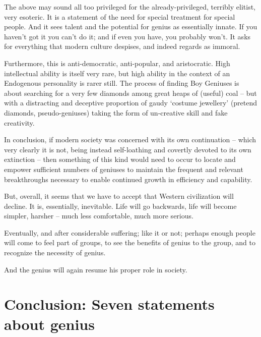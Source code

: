 \documentclass[
]{book}
\begin{document}
The above may sound all too privileged for the already-privileged, terribly elitist, very esoteric. It is a statement of the need for special treatment for special people. And it sees talent and the potential for genius as essentially innate. If you haven't got it you can't do it; and if even you have, you probably won't. It asks for everything that modern culture despises, and indeed regards as immoral.

Furthermore, this is anti-democratic, anti-popular, and aristocratic. High intellectual ability is itself very rare, but high ability in the context of an Endogenous personality is rarer still. The process of finding Boy Geniuses is about searching for a very few diamonds among great heaps of (useful) coal -- but with a distracting and deceptive proportion of gaudy `costume jewellery' (pretend diamonds, pseudo-geniuses) taking the form of un-creative skill and fake creativity.

In conclusion, if modern society was concerned with its own continuation -- which very clearly it is not, being instead self-loathing and covertly devoted to its own extinction -- then something of this kind would need to occur to locate and empower sufficient numbers of geniuses to maintain the frequent and relevant breakthroughs necessary to enable continued growth in efficiency and capability.

But, overall, it seems that we have to accept that Western civilization will decline. It is, essentially, inevitable. Life will go backwards, life will become simpler, harsher -- much less comfortable, much more serious.

Eventually, and after considerable suffering; like it or not; perhaps enough people will come to feel part of groups, to see the benefits of genius to the group, and to recognize the necessity of genius.

And the genius will again resume his proper role in society.

\hypertarget{conclusion-seven-statements-about-genius}{%
\chapter{Conclusion: Seven statements about genius}\label{conclusion-seven-statements-about-genius}}
\end{document}
